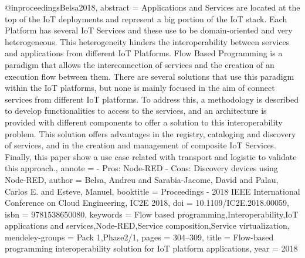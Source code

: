 @inproceedings{Belsa2018,
    abstract = {Applications and Services are located at the top of the IoT deployments and represent a big portion of the IoT stack. Each Platform has several IoT Services and these use to be domain-oriented and very heterogeneous. This heterogeneity hinders the interoperability between services and applications from different IoT Platforms. Flow Based Programming is a paradigm that allows the interconnection of services and the creation of an execution flow between them. There are several solutions that use this paradigm within the IoT platforms, but none is mainly focused in the aim of connect services from different IoT platforms. To address this, a methodology is described to develop functionalities to access to the services, and an architecture is provided with different components to offer a solution to this interoperability problem. This solution offers advantages in the registry, cataloging and discovery of services, and in the creation and management of composite IoT Services. Finally, this paper show a use case related with transport and logistic to validate this approach.},
    annote = {- Pros: Node-RED
    - Cons: Discovery devices using Node-RED},
    author = {Belsa, Andreu and Sarabia-Jacome, David and Palau, Carlos E. and Esteve, Manuel},
    booktitle = {Proceedings - 2018 IEEE International Conference on Cloud Engineering, IC2E 2018},
    doi = {10.1109/IC2E.2018.00059},
    isbn = {9781538650080},
    keywords = {Flow based programming,Interoperability,IoT applications and services,Node-RED,Service composition,Service virtualization},
    mendeley-groups = {Pack 1,Phase2/1},
    pages = {304--309},
    title = {{Flow-based programming interoperability solution for IoT platform applications}},
    year = {2018}
}

